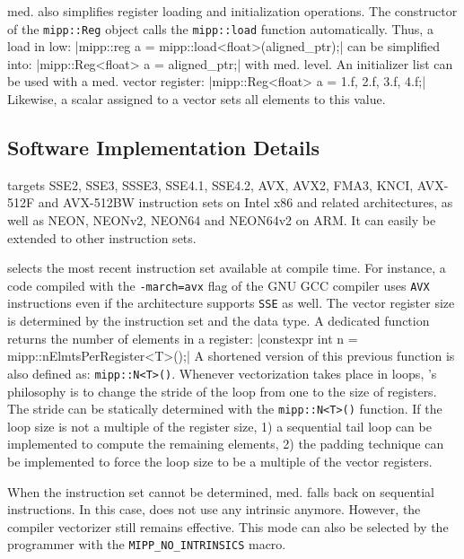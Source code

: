 \MIPP med. also simplifies register loading and initialization operations. The
constructor of the \verb|mipp::Reg| object calls the \verb|mipp::load| function
automatically. Thus, a load in \MIPP low:
|mipp::reg a = mipp::load<float>(aligned_ptr);|
{\noindent
can be simplified into:
}
|mipp::Reg<float> a = aligned_ptr;|
{\noindent
with \MIPP med. level. An initializer list
can be used with a \MIPP med. vector register:
}
|mipp::Reg<float> a = {1.f, 2.f, 3.f, 4.f};|
{\noindent
Likewise, a scalar assigned to a vector sets all elements to this value.
}

\subsection{Software Implementation Details}
\label{sec:opt_mipp_implem}

\MIPP targets SSE2, SSE3, SSSE3, SSE4.1, SSE4.2, AVX, AVX2, FMA3, KNCI, AVX-512F
and AVX-512BW instruction sets on Intel x86 and related architectures, as well
as NEON, NEONv2, NEON64 and NEON64v2 on ARM\R. It can easily be extended to
other instruction sets.

\MIPP selects the most recent instruction set available at compile time. For
instance, a code compiled with the \verb|-march=avx| flag of the GNU GCC
compiler uses \verb|AVX| instructions even if the architecture supports
\verb|SSE| as well. The vector register size is determined by the instruction
set and the data type. A dedicated function returns the number of elements in a
\MIPP register:
|constexpr int n = mipp::nElmtsPerRegister<T>();|
{\noindent
A shortened version of this previous function is also defined as:
\verb|mipp::N<T>()|. Whenever vectorization takes place in loops, \MIPP's
philosophy is to change the stride of the loop from one to the size of
registers. The stride can be statically determined with the \verb|mipp::N<T>()|
function. If the loop size is not a multiple of the register size, 1) a
sequential tail loop can be implemented to compute the remaining elements, 2)
the padding technique can be implemented to force the loop size to be a multiple
of the vector registers.
}

When the instruction set cannot be determined, \MIPP med. falls back on
sequential instructions. In this case, \MIPP does not use any intrinsic anymore.
However, the compiler vectorizer still remains effective. This mode can also be
selected by the programmer with the \verb|MIPP_NO_INTRINSICS| macro.

